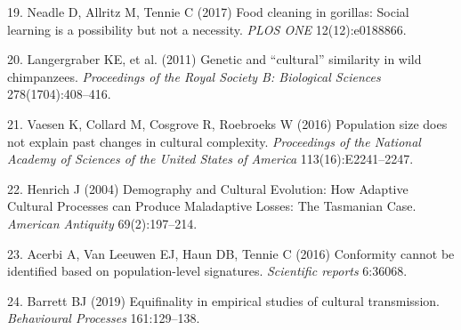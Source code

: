 \documentclass[9pt,twocolumn,twoside,]{pnas-new}
\begin{document}
\hypertarget{ref-neadle_food_2017}{}
19. Neadle D, Allritz M, Tennie C (2017) Food cleaning in gorillas:
Social learning is a possibility but not a necessity. \emph{PLOS ONE}
12(12):e0188866.

\hypertarget{ref-langergraber_genetic_2011}{}
20. Langergraber KE, et al. (2011) Genetic and ``cultural'' similarity
in wild chimpanzees. \emph{Proceedings of the Royal Society B:
Biological Sciences} 278(1704):408--416.

\hypertarget{ref-vaesen_population_2016}{}
21. Vaesen K, Collard M, Cosgrove R, Roebroeks W (2016) Population size
does not explain past changes in cultural complexity. \emph{Proceedings
of the National Academy of Sciences of the United States of America}
113(16):E2241--2247.

\hypertarget{ref-henrich_demography_2004}{}
22. Henrich J (2004) Demography and Cultural Evolution: How Adaptive
Cultural Processes can Produce Maladaptive Losses: The Tasmanian Case.
\emph{American Antiquity} 69(2):197--214.

\hypertarget{ref-acerbi_conformity_2016}{}
23. Acerbi A, Van Leeuwen EJ, Haun DB, Tennie C (2016) Conformity cannot
be identified based on population-level signatures. \emph{Scientific
reports} 6:36068.

\hypertarget{ref-barrett_equifinality_2019}{}
24. Barrett BJ (2019) Equifinality in empirical studies of cultural
transmission. \emph{Behavioural Processes} 161:129--138.



% 
\end{document}

